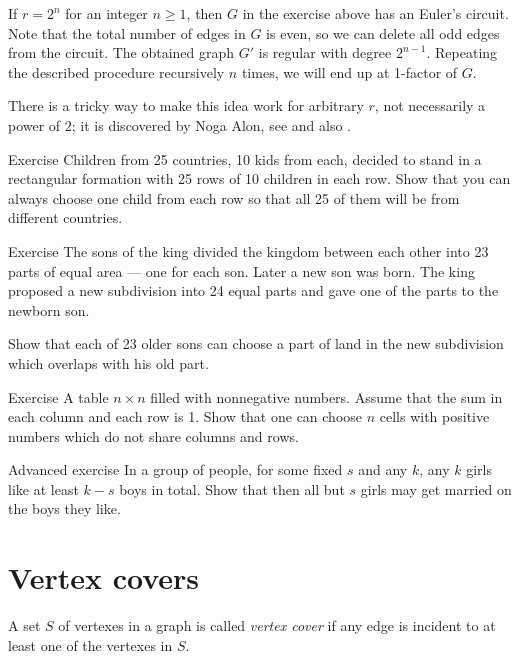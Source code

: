 If $r=2^n$ for an integer $n\ge 1$, then $G$ in the exercise above has an Euler's circuit. 
Note that the total number of edges in $G$ is even, so we can delete all odd edges from the circuit.
The obtained graph $G'$ is regular with degree $2^{n-1}$.
Repeating the described procedure recursively $n$ times, 
we will end up at 1-factor of $G$.

There is a tricky way to make this idea work for arbitrary $r$, not necessarily a power of $2$; 
it is discovered by Noga Alon, see \cite{alon} and also \cite{17-camels}. 

\begin{thm}{Exercise}
Children from 25 countries, 10 kids from each, decided to stand in a rectangular formation with 25 rows of 10 children in each row.
Show that you can always choose one child from each row so that all 25 of them will be from different countries.
\end{thm}

\begin{thm}{Exercise}
The sons of the king divided the kingdom between each other into 23 parts of equal area --- one for each son.
Later a new son was born. 
The king proposed a new subdivision into 24 equal parts and gave one of the parts to the newborn son.

Show that each of 23 older sons can choose a part of land in the new subdivision which overlaps with his old part.
\end{thm}

\begin{thm}{Exercise} A table $n{\times}n$ filled with nonnegative numbers.
Assume that the sum in each column and each row is 1.
Show that one can choose $n$ cells with positive numbers which do not share columns and rows. 
\end{thm}


\begin{thm}{Advanced exercise}
In a group of people, for some fixed $s$ and any $k$,
any $k$ girls like at least $k-s$ boys in total.
Show that then all but $s$ girls may get married on the boys they like.
\end{thm}



\section*{Vertex covers}

A set $S$ of vertexes in a graph is called \emph{vertex cover} if any edge is incident to at least one of the vertexes in $S$.

